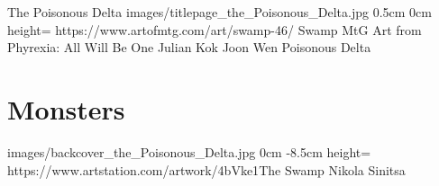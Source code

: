 \documentclass[letterpaper,openany,twoside,twocolumn]{book}
\begin{document}
	\regionTitlePage
		{The Poisonous Delta}
		{images/titlepage_the_Poisonous_Delta.jpg}
		{0.5cm}
		{0cm}
		{height=\paperheight}
		{https://www.artofmtg.com/art/swamp-46/}
		{Swamp MtG Art from Phyrexia: All Will Be One}
		{Julian Kok Joon Wen}
		{Poisonous Delta}
	
	\tableofcontents
	
	\mainmatter
	
	\MonsterSheetGeometry
	\part{Monsters}
	
	
	
	
	\renewcommand{\ThanksSpacing}{1cm}
	\regionLastPage
		{images/backcover_the_Poisonous_Delta.jpg}
		{0cm}
		{-8.5cm}
		{height=\paperheight}
		{https://www.artstation.com/artwork/4bVke1}{The Swamp}
		{Nikola Sinitsa}
		{}
\end{document}
